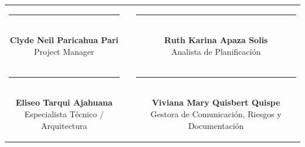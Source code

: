 \documentclass[11pt,a4paper]{article}
\begin{document}
\begin{center}
\begin{tabular}{c c c}
    \parbox{6.5cm}{\centering \rule{6.0cm}{0.6pt}\\[5pt] \textbf{Clyde Neil Paricahua Pari}\\[2pt] {\footnotesize Project Manager}}
    & \hspace{0.8cm} &
    \parbox{6.5cm}{\centering \rule{6.0cm}{0.6pt}\\[5pt] \textbf{Ruth Karina Apaza Solis}\\[2pt] {\footnotesize Analista de Planificación}}
    \\[2.0cm]
    \parbox{6.5cm}{\centering \rule{6.0cm}{0.6pt}\\[5pt] \textbf{Eliseo Tarqui Ajahuana}\\[2pt] {\footnotesize Especialista Técnico / Arquitectura}}
    & \hspace{0.8cm} &
    \parbox{6.5cm}{\centering \rule{6.0cm}{0.6pt}\\[5pt] \textbf{Viviana Mary Quisbert Quispe}\\[2pt] {\footnotesize Gestora de Comunicación, Riesgos y Documentación}}
\end{tabular}
\end{center}
\end{document}
